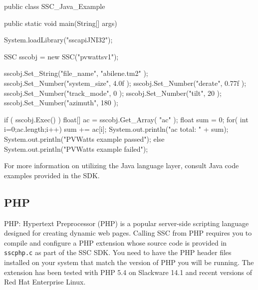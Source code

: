 \documentclass{scrartcl} %
\newcommand{\+}{\discretionary{\mbox{\scriptsize$\hookleftarrow$}}{}{}}
\begin{document}
\begin{verbatimtab}[4]

public class SSC_Java_Example {
   
    public static void main(String[] args)
    {
        System.loadLibrary("sscapiJNI32");
		
        SSC sscobj = new SSC("pvwattsv1");

        sscobj.Set_String("file_name", "abilene.tm2" );
        sscobj.Set_Number("system_size", 4.0f );
        sscobj.Set_Number("derate", 0.77f );
        sscobj.Set_Number("track_mode", 0 );
        sscobj.Set_Number("tilt", 20 );
        sscobj.Set_Number("azimuth", 180 );
        
		if ( sscobj.Exec() )
        {
            float[] ac = sscobj.Get_Array( "ac" );
            float sum = 0;
            for( int i=0;ac.length;i++)
            {
                sum += ac[i];
            }
            System.out.println("ac total: " + sum);
            System.out.println("PVWatts example passed");
        }
        else
        {
            System.out.println("PVWatts example failed");
        }
    }    
}

\end{verbatimtab}

For more information on utilizing the Java language layer, consult Java code examples provided in the SDK.  


\subsection{PHP}

PHP: Hypertext Preprocessor (PHP) is a popular server-side scripting language designed for creating dynamic web pages.  Calling SSC from PHP requires you to compile and configure a PHP extension whose source code is provided in \texttt{sscphp.c} as part of the SSC SDK.  You need to have the PHP header files installed on your system that match the version of PHP you will be running.  The extension has been tested with PHP 5.4 on Slackware 14.1 and recent versions of Red Hat Enterprise Linux.
\end{document}
